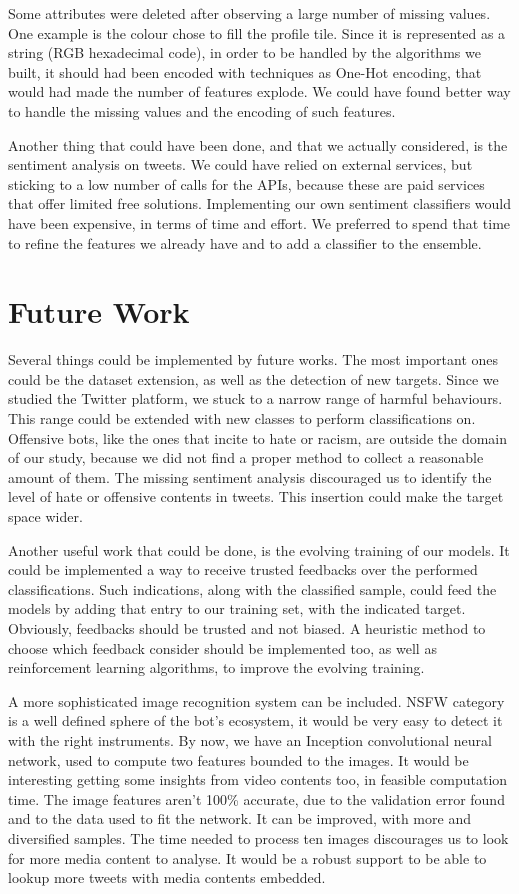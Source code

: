Some attributes were deleted after observing a large number of missing values. One example is the colour chose to fill the profile tile. Since it is represented as a string (RGB hexadecimal code), in order to be handled by the algorithms we built, it should had been encoded with techniques as One-Hot encoding, that would had made the number of features explode. We could have found better way to handle the missing values and the encoding of such features.

Another thing that could have been done, and that we actually considered, is the sentiment analysis on tweets. We could have relied on external services, but sticking to a low number of calls for the APIs, because these are paid services that offer limited free solutions. Implementing our own sentiment classifiers would have been expensive, in terms of time and effort. We preferred to spend that time to refine the features we already have and to add a classifier to the ensemble.

\section{Future Work}
Several things could be implemented by future works. The most important ones could be the dataset extension, as well as the detection of new targets.
Since we studied the Twitter platform, we stuck to a narrow range of harmful behaviours. This range could be extended with new classes to perform classifications on. Offensive bots, like the ones that incite to hate or racism, are outside the domain of our study, because we did not find a proper method to collect a reasonable amount of them. The missing sentiment analysis discouraged us to identify the level of hate or offensive contents in tweets. This insertion could make the target space wider.

Another useful work that could be done, is the evolving training of our models. It could be implemented a way to receive trusted feedbacks over the performed classifications. Such indications, along with the classified sample, could feed the models by adding that entry to our training set, with the indicated target. Obviously, feedbacks should be trusted and not biased. A heuristic method to choose which feedback consider should be implemented too, as well as reinforcement learning algorithms, to improve the evolving training.

A more sophisticated image recognition system can be included. NSFW category is a well defined sphere of the bot's ecosystem, it would be very easy to detect it with the right instruments. By now, we have an Inception convolutional neural network, used to compute two features bounded to the images. It would be interesting getting some insights from video contents too, in feasible computation time. The image features aren't 100\% accurate, due to the validation error found and to the data used to fit the network. It can be improved, with more and diversified samples. The time needed to process ten images discourages us to look for more media content to analyse. It would be a robust support to be able to lookup more tweets with media contents embedded.

